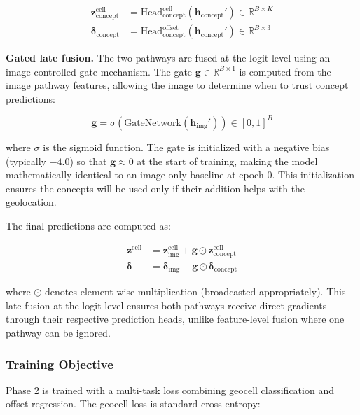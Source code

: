 \documentclass{article}
\begin{document}
\begin{align}
\mathbf{z}_{\text{concept}}^{\text{cell}} &= \text{Head}_{\text{concept}}^{\text{cell}}(\mathbf{h}_{\text{concept}}') \in \mathbb{R}^{B \times K} \\
\boldsymbol{\delta}_{\text{concept}} &= \text{Head}_{\text{concept}}^{\text{offset}}(\mathbf{h}_{\text{concept}}') \in \mathbb{R}^{B \times 3}
\end{align}

\textbf{Gated late fusion.} The two pathways are fused at the logit level using an image-controlled gate mechanism. The gate $\mathbf{g} \in \mathbb{R}^{B \times 1}$ is computed from the image pathway features, allowing the image to determine when to trust concept predictions:

\begin{equation}
\mathbf{g} = \sigma(\text{GateNetwork}(\mathbf{h}_{\text{img}}')) \in [0, 1]^B
\end{equation}

where $\sigma$ is the sigmoid function. The gate is initialized with a negative bias (typically $-4.0$) so that $\mathbf{g} \approx 0$ at the start of training, making the model mathematically identical to an image-only baseline at epoch 0. This initialization ensures the concepts will be used only if their addition helps with the geolocation.

The final predictions are computed as:

\begin{align}
\mathbf{z}^{\text{cell}} &= \mathbf{z}_{\text{img}}^{\text{cell}} + \mathbf{g} \odot \mathbf{z}_{\text{concept}}^{\text{cell}} \\
\boldsymbol{\delta} &= \boldsymbol{\delta}_{\text{img}} + \mathbf{g} \odot \boldsymbol{\delta}_{\text{concept}}
\end{align}

where $\odot$ denotes element-wise multiplication (broadcasted appropriately). This late fusion at the logit level ensures both pathways receive direct gradients through their respective prediction heads, unlike feature-level fusion where one pathway can be ignored.

\subsubsection{Training Objective}

Phase 2 is trained with a multi-task loss combining geocell classification and offset regression. The geocell loss is standard cross-entropy:
\end{document}
